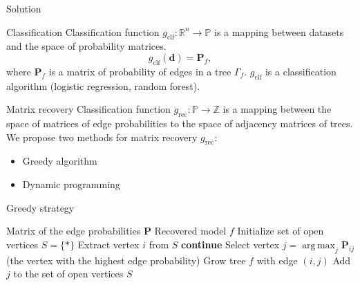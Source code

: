 \documentclass{beamer}
\DeclareMathOperator*{\argmax}{arg\,max}
\begin{document}
\begin{frame}{Solution}
	\begin{block}{Classification}
		Classification function $g_{\text{clf}}: \mathbb{R}^n \rightarrow \mathbb{P}$ is a mapping between datasets and the space of probability matrices.
		\[g_{\text{clf}}(\mathbf{d}) = \mathbf{P}_f,\]
		where $\mathbf{P}_f$ is a matrix of probability of edges in a tree $\Gamma_f$. $g_{\text{clf}}$ is a classification algorithm (logistic regression, random forest).
	\end{block}

	\begin{block}{Matrix recovery}
		Classification function $g_{\text{rec}}: \mathbb{P} \rightarrow \mathbb{Z}$ is a mapping between the space of matrices of edge probabilities to the space of adjacency matrices of trees. We propose two methods for matrix recovery $g_{\text{rec}}$:
		\begin{itemize}
			\item Greedy algorithm
			\item Dynamic programming
		\end{itemize}
	\end{block}
\end{frame}

\begin{frame}{Greedy strategy}

\begin{algorithm}[H]
		\caption{Greedy algorithm}
		\label{alg1}
		\begin{algorithmic}
			\REQUIRE Matrix of the edge probabilities $\mathbf{P}$
			\ENSURE Recovered model $f$
			\STATE Initialize set of open vertices $S = \{*\}$
			\STATE Extract vertex $i$ from $S$
			\STATE \textbf{continue}
			\ENDIF
			\STATE Select vertex $j=\argmax_j \mathbf{P}_{ij}$ (the vertex with the highest edge probability)
			\STATE Grow tree $f$ with edge $(i, j)$
			\STATE Add $j$ to the set of open vertices $S$
			\ENDWHILE
		\end{algorithmic}
	\end{algorithm}
\end{frame}
\end{document}

